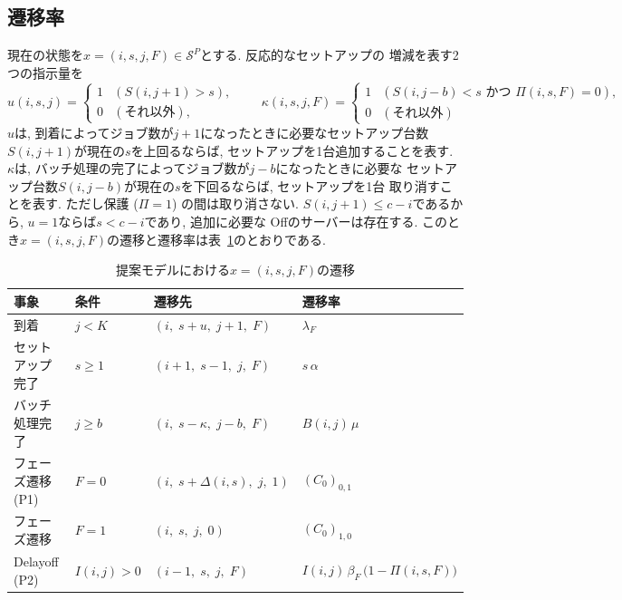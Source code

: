 \documentclass[a4paper, 11pt, dvipdfmx]{jsreport}
\begin{document}
\subsection{遷移率}
\label{sec:pred-transitions}
 
現在の状態を$x = (i, s, j, F) \in \mathcal{S}^{P}$とする. 反応的なセットアップの
増減を表す2つの指示量を
\[
u(i, s, j) =
\begin{cases}
    1 & (S(i, j+1) > s), \\
    0 & (\text{それ以外}), 
\end{cases}
\qquad
\kappa(i, s, j, F) =
\begin{cases}
    1 & (S(i, j-b) < s \text{ かつ } \Pi(i, s, F) = 0), \\
    0 & (\text{それ以外})
\end{cases}
\]
$u$は, 到着によってジョブ数が$j+1$になったときに必要なセットアップ台数
$S(i, j+1)$が現在の$s$を上回るならば, セットアップを1台追加することを表す. 
$\kappa$は, バッチ処理の完了によってジョブ数が$j-b$になったときに必要な
セットアップ台数$S(i, j-b)$が現在の$s$を下回るならば, セットアップを1台
取り消すことを表す. ただし保護 ($\Pi = 1$) の間は取り消さない. 
$S(i, j+1) \le c-i$であるから, $u = 1$ならば$s < c-i$であり, 追加に必要な
Offのサーバーは存在する. 
このとき$x = (i, s, j, F)$の遷移と遷移率は表~\ref{tab:pred-transitions}のとおりである. 
 
\begin{table}[H]
\centering
\caption{提案モデルにおける$x = (i, s, j, F)$の遷移}
\label{tab:pred-transitions}
\begin{tabular}{llll}
\toprule
事象 & 条件 & 遷移先 & 遷移率 \\
\midrule
到着 & $j < K$ & $(i, \; s + u, \; j+1, \; F)$ & $\lambda_F$ \\
セットアップ完了 & $s \ge 1$ & $(i+1, \; s-1, \; j, \; F)$ & $s\, \alpha$ \\
バッチ処理完了 & $j \ge b$ & $(i, \; s - \kappa, \; j-b, \; F)$ & $B(i, j)\, \mu$ \\
フェーズ遷移 (P1) & $F = 0$ & $(i, \; s + \Delta(i, s), \; j, \; 1)$ & $(C_0)_{0, 1}$ \\
フェーズ遷移 & $F = 1$ & $(i, \; s, \; j, \; 0)$ & $(C_0)_{1, 0}$ \\
Delayoff (P2) & $I(i, j) > 0$ & $(i-1, \; s, \; j, \; F)$
    & $I(i, j)\, \beta_F\, \bigl(1 - \Pi(i, s, F)\bigr)$ \\
\bottomrule
\end{tabular}
\end{table}
 
\end{document}
